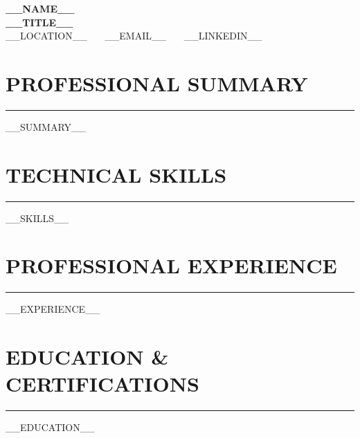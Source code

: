 \documentclass[10pt,letterpaper]{article}
\begin{document}
\begin{center}
    {\LARGE \textbf{\color{darkgray} __NAME__}} \\ \vspace{2pt}
    {\large \textbf{__TITLE__}} \\ \vspace{2pt}
    \small __LOCATION__ \ \textbar\ \ __EMAIL__ \ \textbar\ \ __LINKEDIN__
\end{center}

\vspace{-4pt}
\section*{\large\bfseries\color{primary}\uppercase{Professional Summary}}
\vspace{-4pt}\rule{\textwidth}{0.8pt}\vspace{3pt}
__SUMMARY__

\section*{\large\bfseries\color{primary}\uppercase{Technical Skills}}
\vspace{-4pt}\rule{\textwidth}{0.8pt}\vspace{3pt}
\small
__SKILLS__

\section*{\large\bfseries\color{primary}\uppercase{Professional Experience}}
\vspace{-4pt}\rule{\textwidth}{0.8pt}\vspace{3pt}
\small
__EXPERIENCE__

\section*{\large\bfseries\color{primary}\uppercase{Education \& Certifications}}
\vspace{-4pt}\rule{\textwidth}{0.8pt}\vspace{3pt}
\small
__EDUCATION__
\end{document}
